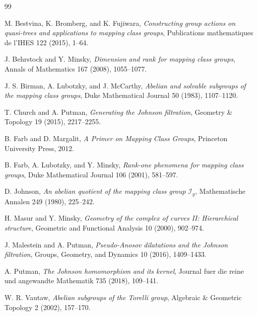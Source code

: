 \documentclass[11pt]{article}
\begin{document}
\begin{thebibliography}{99}

M. Bestvina, K. Bromberg, and K. Fujiwara,
\emph{Constructing group actions on quasi-trees and applications to mapping class groups},
Publications mathematiques de l'IHES 122 (2015), 1--64.

J. Behrstock and Y. Minsky,
\emph{Dimension and rank for mapping class groups},
Annals of Mathematics 167 (2008), 1055--1077.

J. S. Birman, A. Lubotzky, and J. McCarthy,
\emph{Abelian and solvable subgroups of the mapping class groups},
Duke Mathematical Journal 50 (1983), 1107--1120.

T. Church and A. Putman,
\emph{Generating the Johnson filtration},
Geometry \& Topology 19 (2015), 2217--2255.

B. Farb and D. Margalit,
\emph{A Primer on Mapping Class Groups},
Princeton University Press, 2012.

B. Farb, A. Lubotzky, and Y. Minsky,
\emph{Rank-one phenomena for mapping class groups},
Duke Mathematical Journal 106 (2001), 581--597.

D. Johnson,
\emph{An abelian quotient of the mapping class group \(\mathcal I_g\)},
Mathematische Annalen 249 (1980), 225--242.

H. Masur and Y. Minsky,
\emph{Geometry of the complex of curves II: Hierarchical structure},
Geometric and Functional Analysis 10 (2000), 902--974.

J. Malestein and A. Putman,
\emph{Pseudo-Anosov dilatations and the Johnson filtration},
Groups, Geometry, and Dynamics 10 (2016), 1409--1433.

A. Putman,
\emph{The Johnson homomorphism and its kernel},
Journal fuer die reine und angewandte Mathematik 735 (2018), 109--141.

W. R. Vautaw,
\emph{Abelian subgroups of the Torelli group},
Algebraic \& Geometric Topology 2 (2002), 157--170.

\end{thebibliography}
\end{document}

